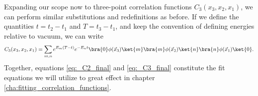 Expanding our scope now to three-point correlation functions $C_3(x_3,x_2,x_1)$, we can perform similar substitutions and redefinitions as before.  If we define the quantities $t=t_2-t_1$ and $T=t_3-t_1$, and keep the convention of defining energies relative to vacuum, we can write
\begin{equation}\label{eq:_C3_final}
    C_3(x_3,x_2,x_1) = \sum_{m,n} e^{E_m(T-t)}e^{-E_nt}\bra{0}\phi(\vec{x}
    _3)\ket{m}\bra{m}\phi(\vec{x}_2)\ket{n}\bra{n}\phi(\vec{x}_1)\ket{0}.
\end{equation}
Together, equations \ref{eq:_C2_final} and \ref{eq:_C3_final} constitute the fit equations we will utilize to great effect in chapter \ref{cha:fitting_correlation_functions}.